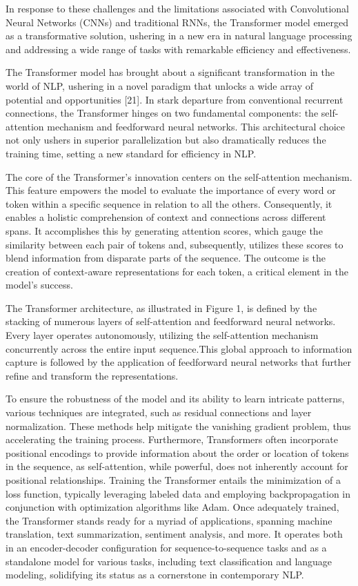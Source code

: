 \documentclass[fleqn,10pt]{thescipub} %
\begin{document}
In response to these challenges and the limitations associated with Convolutional Neural Networks (CNNs) and traditional RNNs, the Transformer model emerged as a transformative solution, ushering in a new era in natural language processing and addressing a wide range of tasks with remarkable efficiency and effectiveness.

The Transformer model has brought about a significant transformation in the world of NLP, ushering in a novel paradigm that unlocks a wide array of potential and opportunities [21]. In stark departure from conventional recurrent connections, the Transformer hinges on two fundamental components: the self-attention mechanism and feedforward neural networks. This architectural choice not only ushers in superior parallelization but also dramatically reduces the training time, setting a new standard for efficiency in NLP.


The core of the Transformer's innovation centers on the self-attention mechanism. This feature empowers the model to evaluate the importance of every word or token within a specific sequence in relation to all the others. Consequently, it enables a holistic comprehension of context and connections across different spans. It accomplishes this by generating attention scores, which gauge the similarity between each pair of tokens and, subsequently, utilizes these scores to blend information from disparate parts of the sequence. The outcome is the creation of context-aware representations for each token, a critical element in the model's success.

The Transformer architecture, as illustrated in Figure 1, is defined by the stacking of numerous layers of self-attention and feedforward neural networks. Every layer operates autonomously, utilizing the self-attention mechanism concurrently across the entire input sequence.This global approach to information capture is followed by the application of feedforward neural networks that further refine and transform the representations.


To ensure the robustness of the model and its ability to learn intricate patterns, various techniques are integrated, such as residual connections and layer normalization. These methods help mitigate the vanishing gradient problem, thus accelerating the training process. Furthermore, Transformers often incorporate positional encodings to provide information about the order or location of tokens in the sequence, as self-attention, while powerful, does not inherently account for positional relationships.
Training the Transformer entails the minimization of a loss function, typically leveraging labeled data and employing backpropagation in conjunction with optimization algorithms like Adam. Once adequately trained, the Transformer stands ready for a myriad of applications, spanning machine translation, text summarization, sentiment analysis, and more. It operates both in an encoder-decoder configuration for sequence-to-sequence tasks and as a standalone model for various tasks, including text classification and language modeling, solidifying its status as a cornerstone in contemporary NLP.
\end{document}
